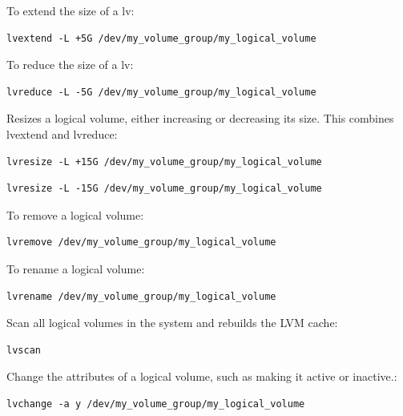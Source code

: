 \documentclass{article}
\newenvironment{codetemplate}[1][]{%
  \mybasecolorbox[#1]
  \itshape
}{%
  \endmybasecolorbox
}
\begin{document}
To extend the size of a lv:
\begin{codetemplate}
\begin{verbatim}
lvextend -L +5G /dev/my_volume_group/my_logical_volume
\end{verbatim}
\end{codetemplate}

To reduce the size of a lv:
\begin{codetemplate}
\begin{verbatim}
lvreduce -L -5G /dev/my_volume_group/my_logical_volume
\end{verbatim}
\end{codetemplate}

Resizes a logical volume, either increasing or decreasing its size. This combines lvextend and lvreduce:
\begin{codetemplate}
\begin{verbatim}
lvresize -L +15G /dev/my_volume_group/my_logical_volume
\end{verbatim}
\end{codetemplate}
\begin{codetemplate}
\begin{verbatim}
lvresize -L -15G /dev/my_volume_group/my_logical_volume
\end{verbatim}
\end{codetemplate}

To remove a logical volume:
\begin{codetemplate}
\begin{verbatim}
lvremove /dev/my_volume_group/my_logical_volume
\end{verbatim}
\end{codetemplate}

To rename a logical volume:
\begin{codetemplate}
\begin{verbatim}
lvrename /dev/my_volume_group/my_logical_volume
\end{verbatim}
\end{codetemplate}

Scan all logical volumes in the system and rebuilds the LVM cache:
\begin{codetemplate}
\begin{verbatim}
lvscan
\end{verbatim}
\end{codetemplate}

Change the attributes of a logical volume, such as making it active or inactive.:
\begin{codetemplate}
\begin{verbatim}
lvchange -a y /dev/my_volume_group/my_logical_volume
\end{verbatim}
\end{codetemplate}
\end{document}
